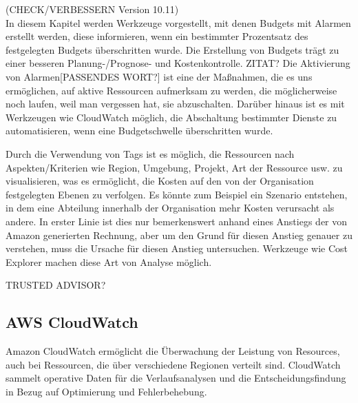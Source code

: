 (CHECK/VERBESSERN Version 10.11)\\
In diesem Kapitel werden Werkzeuge vorgestellt, mit denen Budgets mit Alarmen erstellt werden, diese informieren, wenn ein bestimmter Prozentsatz des festgelegten Budgets überschritten wurde. Die Erstellung von Budgets trägt zu einer besseren Planung-/Prognose- und Kostenkontrolle. ZITAT?
Die Aktivierung von Alarmen[PASSENDES WORT?] ist eine der Maßnahmen, die es uns ermöglichen, auf aktive Ressourcen aufmerksam zu werden, die möglicherweise noch laufen, weil man vergessen hat, sie abzuschalten.
Darüber hinaus ist es mit Werkzeugen wie CloudWatch möglich, die Abschaltung bestimmter Dienste zu automatisieren, wenn eine Budgetschwelle überschritten wurde.

Durch die Verwendung von Tags ist es möglich, die Ressourcen nach Aspekten/Kriterien wie Region, Umgebung, Projekt, Art der Ressource usw. zu visualisieren, was es ermöglicht, die Kosten auf den von der Organisation festgelegten Ebenen zu verfolgen. Es könnte zum Beispiel ein Szenario entstehen, in dem eine Abteilung innerhalb der Organisation mehr Kosten verursacht als andere. In erster Linie ist dies nur bemerkenswert anhand eines Anstiegs der von Amazon generierten Rechnung, aber um den Grund für diesen Anstieg genauer zu verstehen, muss die Ursache für diesen Anstieg untersuchen. Werkzeuge wie Cost Explorer machen diese Art von Analyse möglich.

TRUSTED ADVISOR?




\subsection{AWS CloudWatch}

Amazon CloudWatch ermöglicht die Überwachung der Leistung von Resources, auch bei Ressourcen, die über verschiedene Regionen verteilt sind. 
CloudWatch sammelt operative Daten für die Verlaufsanalysen und die Entscheidungsfindung in Bezug auf Optimierung und Fehlerbehebung.

